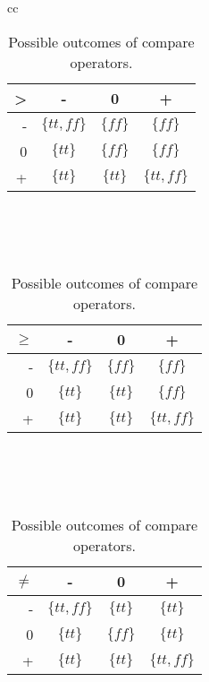 \begin{table}
\begin{tabular}{cc}
    \begin{minipage}{0.4\linewidth}
		\begin{tabular}{| r | c | c | c |}
		\hline
		 >   & -   & 0 & +  \\
		\hline
		 -  & $\{tt,ff\}$ & $\{ff\}$ & $\{ff\}$  \\
		\hline
		 0  & $\{tt\}$ & $\{ff\}$ & $\{ff\}$ \\
		\hline
		 +  & $\{tt\}$ & $\{tt\}$ & $\{tt,ff\}$ \\
		 \hline
		\end{tabular}
		\\\\\\
		\begin{tabular}{| r | c | c | c |}
		\hline
		 $\geq$   & -   & 0 & +  \\
		\hline
		 -  & $\{tt,ff\}$ & $\{ff\}$ & $\{ff\}$  \\
		\hline
		 0  & $\{tt\}$ & $\{tt\}$ & $\{ff\}$ \\
		\hline
		 +  & $\{tt\}$ & $\{tt\}$ & $\{tt,ff\}$ \\
		 \hline
		\end{tabular}
		\\\\\\
		\begin{tabular}{| r | c | c | c |}
		\hline
		 $\neq$   & -   & 0 & +  \\
		\hline
		 -  & $\{tt,ff\}$ & $\{tt\}$ & $\{tt\}$  \\
		\hline
		 0  & $\{tt\}$ & $\{ff\}$ & $\{tt\}$ \\
		\hline
		 +  & $\{tt\}$ & $\{tt\}$ & $\{tt,ff\}$ \\
		 \hline
		\end{tabular}
    \end{minipage}
\end{tabular}
\centering
\caption{Possible outcomes of compare operators.}
\label{table:boolean_operator}
\end{table}



